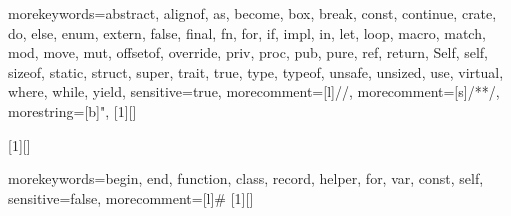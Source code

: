 {
	morekeywords={abstract, alignof, as, become, box, break, const, continue, crate, do, else, enum, extern, false, final, fn, for, if, impl, in, let, loop, macro, match, mod, move, mut, offsetof, override, priv, proc, pub, pure, ref, return, Self, self, sizeof, static, struct, super, trait, true, type, typeof, unsafe, unsized, use, virtual, where, while, yield},
	sensitive=true,
	morecomment=[l]{//},
	morecomment=[s]{/*}{*/},
	morestring=[b]",
}
[1][]{
	\hspace{0mm}
	\lstset{language=rust}
}{%
	\putrefCentered[#1]
	\vspace{3mm}
} 
\newcommand{\inlineRustCode}[1]{\lstinline[%
	language=rust,
	keepspaces,
	breakatwhitespace=true,
	breaklines=true
	]{#1}}

[1][]{
	\hspace{0mm}
	\lstset{language=scala}
}{%
	\putrefCentered[#1]
	\vspace{3mm}
} 
\newcommand{\inlineScalaCode}[1]{\lstinline[%
	language=scala,
	keepspaces,
	breakatwhitespace=true,
	breaklines=true
	]{#1}}

{
	morekeywords={begin, end, function, class, record, helper, for, var, const, self},
	sensitive=false,
	morecomment=[l]{\#}
}
[1][]{
	\hspace{0mm}
	\lstset{language=objectPascal}
}{%
	\putrefCentered[#1]
	\vspace{3mm}
} 
\newcommand{\inlinePascalCode}[1]{\lstinline[%
	language=objectPascal,
	keepspaces,
	breakatwhitespace=true,
	breaklines=true
	]{#1}}

\newcommand{\beastRef}[1]{viz specifikace jazyka Beast (v příloze), oddíl \textit{#1}}
\newcommand{\BeastRef}[1]{Viz specifikace jazyka Beast (v příloze), oddíl \textit{#1}}
